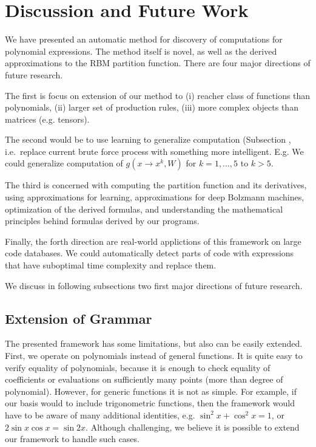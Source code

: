 \section{Discussion and Future Work}

We have presented an automatic method for discovery of computations for
 polynomial expressions. The method itself is novel, as well as the derived
approximations to the RBM partition function.  There are four
major directions of future research. 


The first is focus on extension of our method
to (i) reacher class of functions than polynomials, (ii) larger set of production
rules, (iii) more complex objects than matrices (e.g. tensors).


The second would be to use learning to
generalize computation (Subsection \label{agenda)}, i.e.~replace current brute force process with
something more intelligent. E.g. We could generalize computation of
$g(x \rightarrow x^k, W)$ for $k = 1, \dots, 5$ to $k > 5$. 


The third is concerned with computing
the partition function and its derivatives, using approximations for
learning, approximations for deep Bolzmann machines, optimization of
the derived formulas, and understanding the mathematical principles behind
formulas derived by our programs. 


Finally,
the forth direction are real-world applictions of this framework on
large code databases. We could automatically detect parts of code with
expressions that have suboptimal time complexity and replace them.


We discuss in following subsections two first major directions of future research.


\subsection{Extension of Grammar}
The presented framework has some limitations, but also can be easily extended. First,
we operate on polynomials instead of general functions. It is quite easy to verify
equality of polynomials, because it is enough to check equality of coefficients or
evaluations on sufficiently many points (more than degree of
polynomial). However, for generic functions
it is not as simple. For example, if our basis would to include trigonometric functions, then the
framework would have to be aware of many additional identities,
e.g. $\sin^2{x} + \cos^2{x} = 1$, or $2\sin x \cos x = \sin
2x$. Although challenging, we believe it is possible to extend our
framework to handle such cases. 


